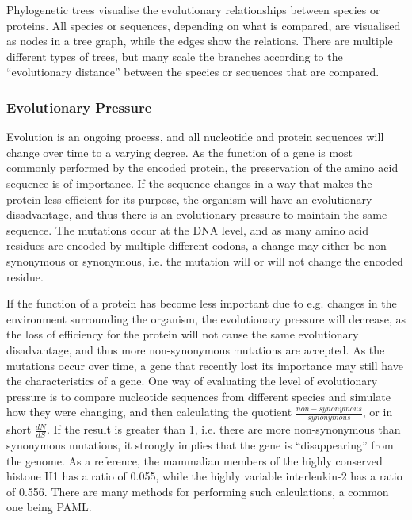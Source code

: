 \documentclass[a4paper, twoside, 12pt, openright]{report}
\begin{document}
Phylogenetic trees visualise the evolutionary relationships between species or proteins. All species or sequences, depending on what is compared, are visualised as nodes in a tree graph, while the edges show the relations. There are multiple different types of trees, but many scale the branches according to the ``evolutionary distance'' between the species or sequences that are compared.


\subsubsection{Evolutionary Pressure}
\label{sec:evolutionary_p}

Evolution is an ongoing process, and all nucleotide and protein sequences will change over time to a varying degree. As the function of a gene is most commonly performed by the encoded protein, the preservation of the amino acid sequence is of importance. If the sequence changes in a way that makes the protein less efficient for its purpose, the organism will have an evolutionary disadvantage, and thus there is an evolutionary pressure to maintain the same sequence. The mutations occur at the DNA level, and as many amino acid residues are encoded by multiple different codons, a change may either be non-synonymous or synonymous, i.e. the mutation will or will not change the encoded residue.

If the function of a protein has become less important due to e.g. changes in the environment surrounding the organism, the evolutionary pressure will decrease, as the loss of efficiency for the protein will not cause the same evolutionary disadvantage, and thus more non-synonymous mutations are accepted. As the mutations occur over time, a gene that recently lost its importance may still have the characteristics of a gene. One way of evaluating the level of evolutionary pressure is to compare nucleotide sequences from different species and simulate how they were changing, and then calculating the quotient $\frac{non-synonymous}{synonymous}$, or in short $\frac{dN}{dS}$. If the result is greater than 1, i.e. there are more non-synonymous than synonymous mutations, it strongly implies that the gene is ``disappearing'' from the genome. As a reference,  the mammalian members of the highly conserved histone H1 has a ratio of 0.055, while the highly variable interleukin-2 has a ratio of 0.556. There are many methods for performing such calculations, a common one being PAML\cite{yang_paml_2007}.
\end{document}
